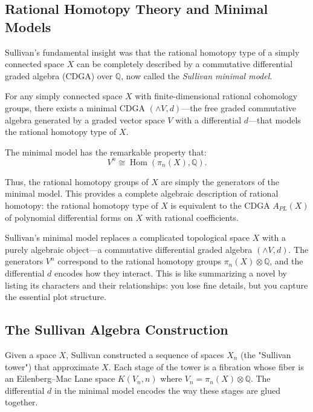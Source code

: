\subsection{Rational Homotopy Theory and Minimal Models}

Sullivan's fundamental insight was that the rational homotopy type of a simply connected space $X$ can be completely described by a commutative differential graded algebra (CDGA) over $\mathbb{Q}$, now called the \emph{Sullivan minimal model}.

For any simply connected space $X$ with finite-dimensional rational cohomology groups, there exists a minimal CDGA $(\wedge V, d)$---the free graded commutative algebra generated by a graded vector space $V$ with a differential $d$---that models the rational homotopy type of $X$.

The minimal model has the remarkable property that:
\[
V^n \cong \operatorname{Hom}(\pi_n(X), \mathbb{Q}).
\]

Thus, the rational homotopy groups of $X$ are simply the generators of the minimal model. This provides a complete algebraic description of rational homotopy: the rational homotopy type of $X$ is equivalent to the CDGA $A_{PL}(X)$ of polynomial differential forms on $X$ with rational coefficients.

\begin{bigidea}
Sullivan's minimal model replaces a complicated topological space $X$ with a purely algebraic object---a commutative differential graded algebra $(\wedge V, d)$. The generators $V^n$ correspond to the rational homotopy groups $\pi_n(X) \otimes \mathbb{Q}$, and the differential $d$ encodes how they interact. This is like summarizing a novel by listing its characters and their relationships: you lose fine details, but you capture the essential plot structure.
\end{bigidea}

\subsection{The Sullivan Algebra Construction}

Given a space $X$, Sullivan constructed a sequence of spaces $X_n$ (the "Sullivan tower") that approximate $X$. Each stage of the tower is a fibration whose fiber is an Eilenberg--Mac Lane space $K(V_n, n)$ where $V_n = \pi_n(X) \otimes \mathbb{Q}$. The differential $d$ in the minimal model encodes the way these stages are glued together.

